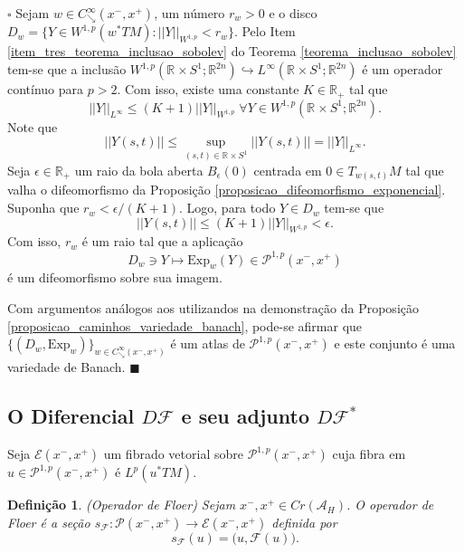 \documentclass[12pt]{book}
\newtheorem{definicao}[teorema]{Definição}
\newenvironment{prova}[1]{$\square$ #1}{\hfill$\blacksquare$}
\newcommand{\bigparenteses}[1]{\Big( #1 \Big) }
\newcommand{\caminhosdecaimentoexponencial}[2]{C^{\infty}_{\searrow}(#1, #2)}
\newcommand{\caminhosdecaimentoexponencialpadrao}{\caminhosdecaimentoexponencial{x^{-}}{x^{+}}}
\newcommand{\caminhosexponenciaisconectantesabrev}{\mathcal{P}(x^{-},x^{+})}
\newcommand{\caminhosexponenciaisconectantes}[2]{\mathcal{P}^{1,p}(#1, #2)}
\newcommand{\caminhosexponenciaisconectantespadrao}{\caminhosexponenciaisconectantes{x^{-}}{x^{+}}}
\newcommand{\circulo}{S^{1}}
\newcommand{\diferencialfloer}{D\operadorFloer}
\newcommand{\diferencialfloeradj}{\diferencialfloer^{*}}
\newcommand{\espacoLp}[1]{L^{p}(#1)}
\newcommand{\espacoLpGeral}[2]{L^{#1}(#2)}
\newcommand{\espacosobolev}[1]{W^{1,p}(#1)}
\newcommand{\espacosobolevcontradominio}[2]{W^{1,p}(#1;#2)}
\newcommand{\espacotangenteponto}[2]{T_{#1}#2}
\newcommand{\Exp}{\text{Exp}}
\newcommand{\fibradocaminhosexponenciais}{\mathcal{E}(x^{-}, x^{+})}
\newcommand{\funcionalH}{\mathcal{A}_{H}}
\newcommand{\operadorFloer}{\mathcal{F}}
\newcommand{\operadorFloerParametro}[1]{\mathcal{F}(#1)}
\newcommand{\norma}[1]{||#1||}
\newcommand{\normaWp}[1]{||#1||_{W^{1,p}}}
\newcommand{\pontoscriticos}[1]{\textit{Cr}(#1)}
\newcommand{\pullbackfibradotangente}[2]{#1^{*}T#2}
\newcommand{\pullbackfibradotangenteM}[1]{\pullbackfibradotangente{#1}{M}}
\newcommand{\retacartesianocirculo}{\real{} \times \circulo}
\newcommand{\real}[1]{\mathbb{R}^{#1}}
\newcommand{\reta}{\real{}}
\begin{document}
	\begin{prova}
		Sejam $w \in \caminhosdecaimentoexponencialpadrao$, um número $r_{w}>0$ e o disco $D_{w}=\{Y \in \espacosobolev{\pullbackfibradotangenteM{w}}: \normaWp{Y}<r_{w} \}$. Pelo Item \ref{item_tres_teorema_inclusao_sobolev} do Teorema \ref{teorema_inclusao_sobolev} tem-se que a inclusão $\espacosobolevcontradominio{\retacartesianocirculo}{\real{2n}} \hookrightarrow \espacoLpGeral{\infty}{\retacartesianocirculo;\real{2n}}$ é um operador contínuo para $p>2$. Com isso, existe uma constante $K\in \reta_{+}$ tal que 
		$$
		\norma{Y}_{L^{\infty}}\leq (K+1)\normaWp{Y}\;\forall Y\in \espacosobolevcontradominio{\retacartesianocirculo}{\real{2n}}.
		$$
		Note que 
		$$
		\norma{Y(s,t)}\leq \sup_{(s,t)\in \retacartesianocirculo}\norma{Y(s,t)} = \norma{Y}_{L^{\infty}}.
		$$
		Seja $\epsilon\in \reta_{+}$ um raio da bola aberta $B_{\epsilon}(0)$ centrada em $0\in \espacotangenteponto{w(s,t)}{M}$ tal que valha o difeomorfismo da Proposição \ref{proposicao_difeomorfismo_exponencial}. Suponha que $r_{w}< \epsilon/(K+1)$. Logo, para todo $Y \in D_{w}$ tem-se que
		$$
		\norma{Y(s,t)} \leq (K+1)\normaWp{Y} < \epsilon.
		$$
		Com isso, $r_{w}$ é um raio tal que a aplicação 
		$$
		D_{w}\ni Y\mapsto \Exp_{w}(Y) \in \caminhosexponenciaisconectantespadrao
		$$ 
		é um difeomorfismo sobre sua imagem. 
		
		Com argumentos análogos aos utilizandos na demonstração da Proposição \ref{proposicao_caminhos_variedade_banach}, pode-se afirmar que $\{(D_{w}, \Exp_{w})\}_{w\in \caminhosdecaimentoexponencialpadrao} $ é um atlas de $\caminhosexponenciaisconectantespadrao$ e este conjunto é uma variedade de Banach.
	\end{prova}
	
	
	\subsection{O Diferencial $\diferencialfloer$ e seu adjunto $\diferencialfloeradj$}\label{secao_operador_floer}
	
	Seja $\fibradocaminhosexponenciais$ um fibrado vetorial sobre $\caminhosexponenciaisconectantespadrao$ cuja fibra em $u \in \caminhosexponenciaisconectantespadrao$ é $\espacoLp{\pullbackfibradotangenteM{u}}$.
	
	\begin{definicao}\label{definicao_operador_floer}
		(Operador de Floer) Sejam $x^{-}, x^{+}\in \pontoscriticos{\funcionalH}$. O operador de Floer é a seção $s_{\operadorFloer}: \caminhosexponenciaisconectantesabrev \to \fibradocaminhosexponenciais$ definida por
		$$
		s_{\operadorFloer}(u)= \bigparenteses{u,\operadorFloerParametro{u}}.
		$$
	\end{definicao}
	
\end{document}
